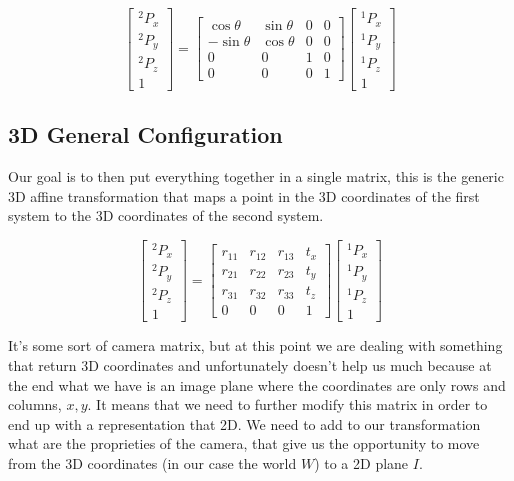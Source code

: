 \[
    \begin{bmatrix}
        {}^2P_x \\
        {}^2P_y \\
        {}^2P_z \\
        1
    \end{bmatrix}
    =
    \begin{bmatrix}
        \cos\theta & \sin\theta & 0 & 0 \\
        -\sin\theta & \cos\theta & 0 & 0 \\
        0 & 0 & 1 & 0 \\
        0 & 0 & 0 & 1
    \end{bmatrix}
    \begin{bmatrix}
        {}^1P_x \\
        {}^1P_y \\
        {}^1P_z \\
        1
    \end{bmatrix}   
\]

\subsection{3D General Configuration}

Our goal is to then put everything together in a single matrix, this is the generic 3D affine transformation that maps a point in the 3D coordinates of the first system to the 3D coordinates of the second system.

\[
    \begin{bmatrix}
        {}^2P_x \\
        {}^2P_y \\
        {}^2P_z \\
        1
    \end{bmatrix}
    =
    \begin{bmatrix}
       r_{11} & r_{12} & r_{13} & t_x \\
       r_{21} & r_{22} & r_{23} & t_y \\
       r_{31} & r_{32} & r_{33} & t_z \\
        0 & 0 & 0 & 1
    \end{bmatrix}
    \begin{bmatrix}
        {}^1P_x \\
        {}^1P_y \\
        {}^1P_z \\
        1
    \end{bmatrix}   
\]

It's some sort of camera matrix, but at this point we are dealing with something that return 3D coordinates and unfortunately doesn't help us much because at the end what we have is an image plane where the coordinates are only rows and columns, \(x, y\). It means that we need to further modify this matrix in order to end up with a representation that 2D. We need to add to our transformation what are the proprieties of the camera, that give us the opportunity to move from the 3D coordinates (in our case the world \(W\)) to a 2D plane \(I\).

